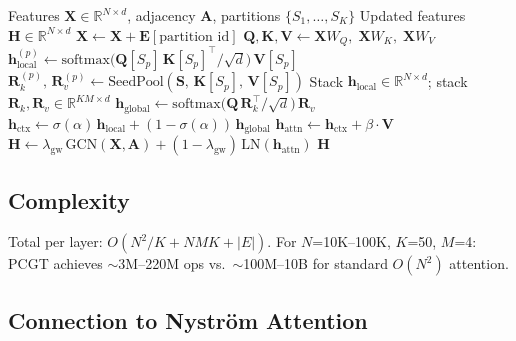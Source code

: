 \documentclass[sigconf]{acmart}
\begin{document}
\begin{algorithm}[t]
\caption{PCGT Forward Pass (one layer)}
\label{alg:pcgt}
\begin{algorithmic}[1]
\REQUIRE Features $\mathbf{X} \in \mathbb{R}^{N \times d}$, adjacency $\mathbf{A}$, partitions $\{S_1, \ldots, S_K\}$
\ENSURE Updated features $\mathbf{H} \in \mathbb{R}^{N \times d}$
\STATE {}
\STATE $\mathbf{X} \leftarrow \mathbf{X} + \mathbf{E}[\text{partition id}]$ 
\STATE $\mathbf{Q}, \mathbf{K}, \mathbf{V} \leftarrow \mathbf{X} W_Q,\; \mathbf{X} W_K,\; \mathbf{X} W_V$
\STATE {}
  \STATE $\mathbf{h}^{(p)}_{\mathrm{local}} \leftarrow \mathrm{softmax}\!\bigl(\mathbf{Q}[S_p]\, \mathbf{K}[S_p]^{\!\top}\!/\sqrt{d}\bigr)\, \mathbf{V}[S_p]$
  \STATE $\mathbf{R}_k^{(p)},\, \mathbf{R}_v^{(p)} \leftarrow \mathrm{SeedPool}(\mathbf{S},\, \mathbf{K}[S_p],\, \mathbf{V}[S_p])$
\ENDFOR
\STATE Stack $\mathbf{h}_{\mathrm{local}} \!\in\! \mathbb{R}^{N \times d}$;\; stack $\mathbf{R}_k, \mathbf{R}_v \!\in\! \mathbb{R}^{KM \times d}$
\STATE {}
\STATE $\mathbf{h}_{\mathrm{global}} \leftarrow \mathrm{softmax}\!\bigl(\mathbf{Q}\, \mathbf{R}_k^{\!\top}\!/\sqrt{d}\bigr)\, \mathbf{R}_v$
\STATE {}
\STATE $\mathbf{h}_{\mathrm{ctx}} \leftarrow \sigma(\alpha)\, \mathbf{h}_{\mathrm{local}} + (1\!-\!\sigma(\alpha))\, \mathbf{h}_{\mathrm{global}}$
\STATE $\mathbf{h}_{\mathrm{attn}} \leftarrow \mathbf{h}_{\mathrm{ctx}} + \beta \cdot \mathbf{V}$
\STATE $\mathbf{H} \leftarrow \lambda_{\mathrm{gw}}\, \mathrm{GCN}(\mathbf{X}, \mathbf{A}) + (1\!-\!\lambda_{\mathrm{gw}})\, \mathrm{LN}(\mathbf{h}_{\mathrm{attn}})$
\RETURN $\mathbf{H}$
\end{algorithmic}
\end{algorithm}

\subsection{Complexity}

Total per layer: $O(N^2/K + NMK + |E|)$. For $N$=10K--100K, $K$=50, $M$=4: PCGT achieves $\sim$3M--220M ops vs.\ $\sim$100M--10B for standard $O(N^2)$ attention.

\subsection{Connection to Nystr\"om Attention}
\label{sec:nystrom}
\end{document}
